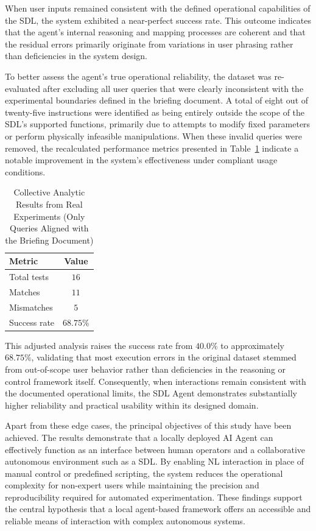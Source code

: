 When user inputs remained consistent with the defined operational capabilities of the SDL, the system exhibited a near-perfect success rate. This outcome indicates that the agent’s internal reasoning and mapping processes are coherent and that the residual errors primarily originate from variations in user phrasing rather than deficiencies in the system design.

To better assess the agent’s true operational reliability, the dataset was re-evaluated after excluding all user queries that were clearly inconsistent with the experimental boundaries defined in the briefing document. A total of eight out of twenty-five instructions were identified as being entirely outside the scope of the SDL’s supported functions, primarily due to attempts to modify fixed parameters or perform physically infeasible manipulations. When these invalid queries were removed, the recalculated performance metrics presented in Table~\ref{tab:realvalid} indicate a notable improvement in the system’s effectiveness under compliant usage conditions.

\begin{table}[H]
\centering
\caption{Collective Analytic Results from Real Experiments (Only Queries Aligned with the Briefing Document)}
\label{tab:realvalid}
\begin{tabular}{l c}
\hline
\textbf{Metric} & \textbf{Value} \\ \hline
Total tests     & $16$ \\
Matches & $11$ \\
Mismatches      & $5$ \\
Success rate    & $68.75\%$ \\ \hline
\end{tabular}
\end{table}

This adjusted analysis raises the success rate from $40.0\%$ to approximately $68.75\%$, validating that most execution errors in the original dataset stemmed from out-of-scope user behavior rather than deficiencies in the reasoning or control framework itself. Consequently, when interactions remain consistent with the documented operational limits, the SDL Agent demonstrates substantially higher reliability and practical usability within its designed domain.

Apart from these edge cases, the principal objectives of this study have been achieved. The results demonstrate that a locally deployed AI Agent can effectively function as an interface between human operators and a collaborative autonomous environment such as a SDL. By enabling NL interaction in place of manual control or predefined scripting, the system reduces the operational complexity for non-expert users while maintaining the precision and reproducibility required for automated experimentation. These findings support the central hypothesis that a local agent-based framework offers an accessible and reliable means of interaction with complex autonomous systems.

